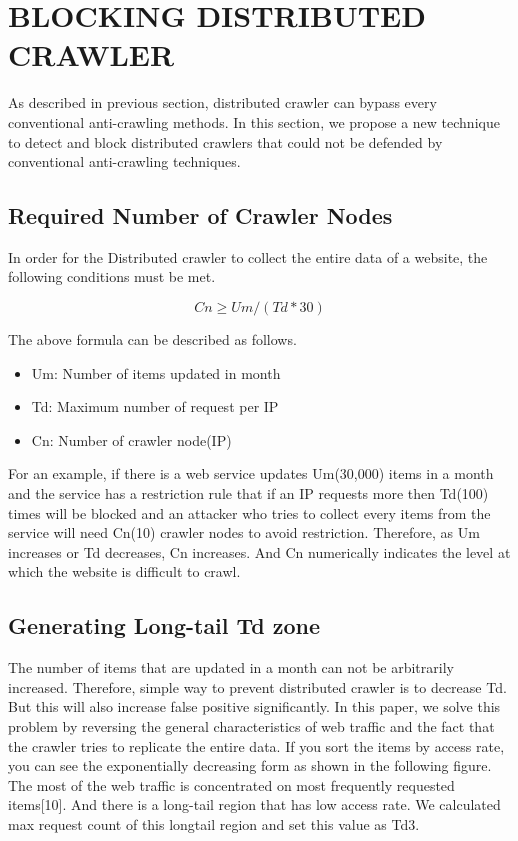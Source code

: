 \documentclass[sigconf,anonymous=true]{acmart}
\begin{document}
%
%
\section{BLOCKING DISTRIBUTED CRAWLER}
As described in previous section, distributed crawler can bypass every conventional anti-crawling methods. In this section, we propose a new technique to detect and block distributed crawlers that could not be defended by conventional anti-crawling techniques.

\subsection{Required Number of Crawler Nodes}
In order for the Distributed crawler to collect the entire data of a website, the following conditions must be met.

\begin{displaymath}
Cn \geq Um / (Td * 30) 
\end{displaymath}

The above formula can be described as follows.

\begin{itemize}
\item Um: Number of items updated in month
\item Td: Maximum number of request per IP
\item Cn: Number of crawler node(IP)
\end{itemize}

For an example, if there is a web service updates Um(30,000) items in a month and the service has a restriction rule that if an IP requests more then Td(100) times will be blocked and an attacker who tries to collect every items from the service will need Cn(10) crawler nodes to avoid restriction.
Therefore, as Um increases or Td decreases, Cn increases. And Cn numerically indicates the level at which the website is difficult to crawl.

\subsection{Generating Long-tail Td zone}
The number of items that are updated in a month can not be arbitrarily increased. Therefore, simple way to prevent distributed crawler is to decrease Td. But this will also increase false positive significantly. In this paper, we solve this problem by reversing the general characteristics of web traffic and the fact that the crawler tries to replicate the entire data.
If you sort the items by access rate, you can see the exponentially decreasing form as shown in the following figure. The most of the web traffic is concentrated on most frequently requested items[10]. And there is a long-tail region that has low access rate. We calculated max request count of this longtail region and set this value as Td3.
\end{document}
